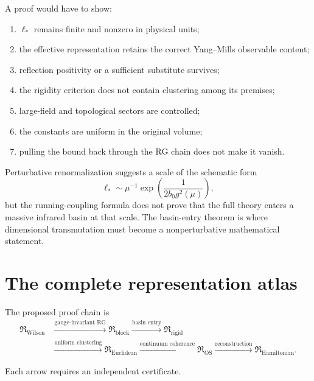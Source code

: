 \documentclass[11pt]{article}
\theoremstyle{remark}
\begin{document}
A proof would have to show:
\begin{enumerate}[leftmargin=2em]
  \item $\ell_*$ remains finite and nonzero in physical units;
  \item the effective representation retains the correct Yang--Mills observable
        content;
  \item reflection positivity or a sufficient substitute survives;
  \item the rigidity criterion does not contain clustering among its premises;
  \item large-field and topological sectors are controlled;
  \item the constants are uniform in the original volume;
  \item pulling the bound back through the RG chain does not make it vanish.
\end{enumerate}

Perturbative renormalization suggests a scale of the schematic form
\begin{equation}
  \ell_*
  \sim
  \mu^{-1}
  \exp\!\left(\frac{1}{2b_0g^2(\mu)}\right),
  \label{eq:transmutation-scale}
\end{equation}
but the running-coupling formula does not prove that the full theory enters a
massive infrared basin at that scale.  The basin-entry theorem is where
dimensional transmutation must become a nonperturbative mathematical statement.

\section{The complete representation atlas}

The proposed proof chain is
\begin{equation}
\begin{aligned}
  \mathfrak R_{\mathrm{Wilson}}
  &\xrightarrow{\text{gauge-invariant RG}}
  \mathfrak R_{\mathrm{block}}
  \xrightarrow{\text{basin entry}}
  \mathfrak R_{\mathrm{rigid}}\\
  &\xrightarrow{\text{uniform clustering}}
  \mathfrak R_{\mathrm{Euclidean}}
  \xrightarrow{\text{continuum coherence}}
  \mathfrak R_{\mathrm{OS}}
  \xrightarrow{\text{reconstruction}}
  \mathfrak R_{\mathrm{Hamiltonian}}.
\end{aligned}
\label{eq:representation-atlas}
\end{equation}

Each arrow requires an independent certificate.
\end{document}
